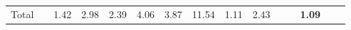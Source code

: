 \begin{tabular}{ll|rrrrrr|rrrrrrr}
  \hline
  Total  & &



  


  
  1.42 & 2.98 & 2.39 & 4.06 & 3.87 & 11.54 & 1.11 & 2.43 &  &  & \textbf{1.09} \\


\end{tabular}
